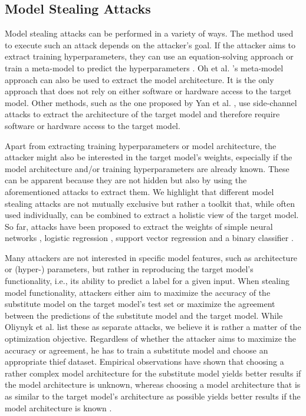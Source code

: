 \subsection{Model Stealing Attacks}
\label{sec:ModelStealing:Attacks}
Model stealing attacks can be performed in a variety of ways. The method used to execute such an attack depends on the attacker's goal. If the attacker
aims to extract training hyperparameters, they can use an equation-solving approach \cite{wang2018stealing} or train a meta-model to predict the hyperparameters
\cite{oh2019towards}. Oh et al. 's meta-model approach can also be used to extract the model architecture. It is the only approach that does not rely on either
software or hardware access to the target model. Other methods, such as the one proposed by Yan et al. \cite{yan2020cache}, use side-channel attacks to extract
the architecture of the target model and therefore require software or hardware access to the target model. \par
Apart from extracting training hyperparameters or model architecture, the attacker might also be interested in the target model's weights, especially if the model
architecture and/or training hyperparameters are already known. These can be apparent because they are not hidden but also by using the 
aforementioned attacks to extract them. We highlight that different model stealing attacks are not mutually exclusive but rather a toolkit that,
while often used individually, can be combined to extract a holistic view of the target model. So far, attacks have been proposed to extract the weights of simple
neural networks \cite{tramer2016stealing}, logistic regression \cite{tramer2016stealing}, support vector regression \cite{reith2019efficiently} and a binary classifier \cite{lowd2005adversarial}. \par
Many attackers are not interested in specific model features, such as architecture or (hyper-) parameters, but rather in reproducing the target model's functionality, i.e.,
its ability to predict a label for a given input. When stealing model functionality, attackers either aim to maximize the accuracy of the substitute model on the target model's
test set or maximize the agreement between the predictions of the substitute model and the target model. While Oliynyk et al. list these as separate attacks, we believe it is
rather a matter of the optimization objective. Regardless of whether the attacker aims to maximize the accuracy or agreement, he has to train a substitute model
and choose an appropriate thief dataset. Empirical observations have shown that choosing a rather complex model architecture for the substitute model yields better results if the
model architecture is unknown, whereas choosing a model architecture that is as similar to the target model's architecture as possible yields better results if the model architecture
is known \parencite{pal2020activethief,orekondy2019knockoff}. \par

